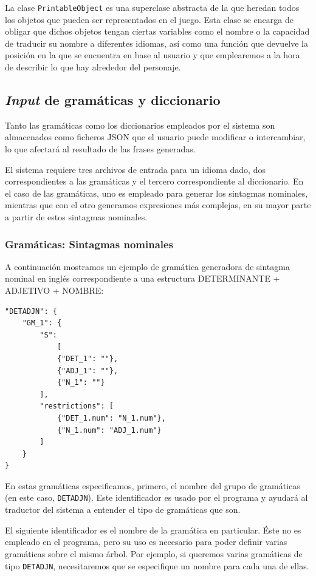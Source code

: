 La clase \texttt{PrintableObject} es una superclase abstracta de la que heredan todos los objetos que pueden ser representados en el juego. Esta clase se encarga de obligar que dichos objetos tengan ciertas variables como el nombre o la capacidad de traducir su nombre a diferentes idiomas, así como una función que devuelve la posición en la que se encuentra en base al usuario y que emplearemos a la hora de describir lo que hay alrededor del personaje.

\subsection{\textit{Input} de gramáticas y diccionario}

Tanto las gramáticas como los diccionarios empleados por el sistema son almacenados como ficheros JSON que el usuario puede modificar o intercambiar, lo que afectará al resultado de las frases generadas.

El sistema requiere tres archivos de entrada para un idioma dado, dos correspondientes a las gramáticas y el tercero correspondiente al diccionario. En el caso de las gramáticas, uno es empleado para generar los sintagmas nominales, mientras que con el otro generamos expresiones más complejas, en su mayor parte a partir de estos sintagmas nominales.

\subsubsection{Gramáticas: Sintagmas nominales}

A continuación mostramos un ejemplo de gramática generadora de sintagma nominal en inglés correspondiente a una estructura DETERMINANTE + ADJETIVO + NOMBRE:

\begin{lstlisting}[style=json]
"DETADJN": {
    "GM_1": {
        "S": 
            [
            {"DET_1": ""}, 
            {"ADJ_1": ""}, 
            {"N_1": ""}
        ],
        "restrictions": [
            {"DET_1.num": "N_1.num"},
            {"N_1.num": "ADJ_1.num"}
        ]
    }
}
\end{lstlisting}

\noindent En estas gramáticas especificamos, primero, el nombre del grupo de gramáticas (en este caso, \texttt{DETADJN}). Este identificador es usado por el programa y ayudará al traductor del sistema a entender el tipo de gramáticas que son.

El siguiente identificador es el nombre de la gramática en particular. Éste no es empleado en el programa, pero su uso es necesario para poder definir varias gramáticas sobre el mismo árbol. Por ejemplo, si queremos varias gramáticas de tipo \texttt{DETADJN}, necesitaremos que se especifique un nombre para cada una de ellas.

